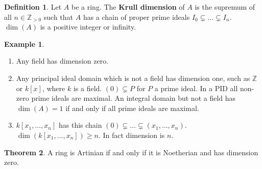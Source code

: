 \documentclass{article}
\newcommand{\Z}{\mathbb{Z}}
\newcommand{\rb}[1]{\left( #1 \right)}
\renewcommand{\sb}[1]{\left[ #1 \right]}
\theoremstyle{definition}\newtheorem{definition}{Definition}[section]
\theoremstyle{definition}\newtheorem{remark}[definition]{Remark}
\theoremstyle{definition}\newtheorem*{example}{Example}
\theoremstyle{definition}\newtheorem*{note}{Note}
\newtheorem{theorem}[definition]{Theorem}
\begin{document}
\begin{definition}
Let $ A $ be a ring. The \textbf{Krull dimension} of $ A $ is the supremum of all $ n \in \Z_{> 0} $ such that $ A $ has a chain of proper prime ideals $ I_0 \subsetneq \dots \subsetneq I_n $. $ \dim\rb{A} $ is a positive integer or infinity.
\end{definition}

\begin{example}
\hfill
\begin{enumerate}
\item Any field has dimension zero.
\item Any principal ideal domain which is not a field has dimension one, such as $ \Z $ or $ k\sb{x} $, where $ k $ is a field. $ \rb{0} \subsetneq P $ for $ P $ a prime ideal. In a PID all non-zero prime ideals are maximal. An integral domain but not a field has $ \dim\rb{A} = 1 $ if and only if all prime ideals are maximal.
\item $ k\sb{x_1, \dots, x_n} $ has this chain $ \rb{0} \subsetneq \dots \subsetneq \rb{x_1, \dots, x_n} $. $ \dim\rb{k\sb{x_1, \dots, x_n}} \ge n $. In fact dimension is $ n $.
\end{enumerate}
\end{example}

\begin{theorem}
A ring is Artinian if and only if it is Noetherian and has dimension zero.
\end{theorem}
\end{document}
